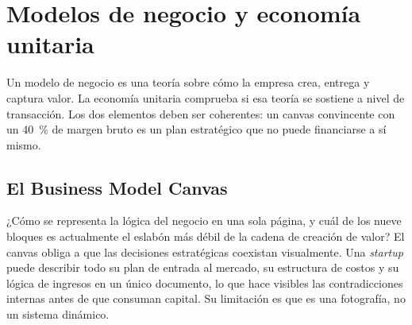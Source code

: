 \chapter{Modelos de negocio y economía unitaria}\label{ch:business-models}


Un modelo de negocio es una teoría sobre cómo la empresa crea, entrega y captura valor. La economía unitaria comprueba si esa teoría se sostiene a nivel de transacción. Los dos elementos deben ser coherentes: un canvas convincente con un \qty{40}{\percent} de margen bruto es un plan estratégico que no puede financiarse a sí mismo.

\section{El Business Model Canvas}\label{sec:bmc}

¿Cómo se representa la lógica del negocio en una sola página, y cuál de los nueve bloques es actualmente el eslabón más débil de la cadena de creación de valor? El canvas obliga a que las decisiones estratégicas coexistan visualmente. Una \emph{startup} puede describir todo su plan de entrada al mercado, su estructura de costos y su lógica de ingresos en un único documento, lo que hace visibles las contradicciones internas antes de que consuman capital. Su limitación es que es una fotografía, no un sistema dinámico.

